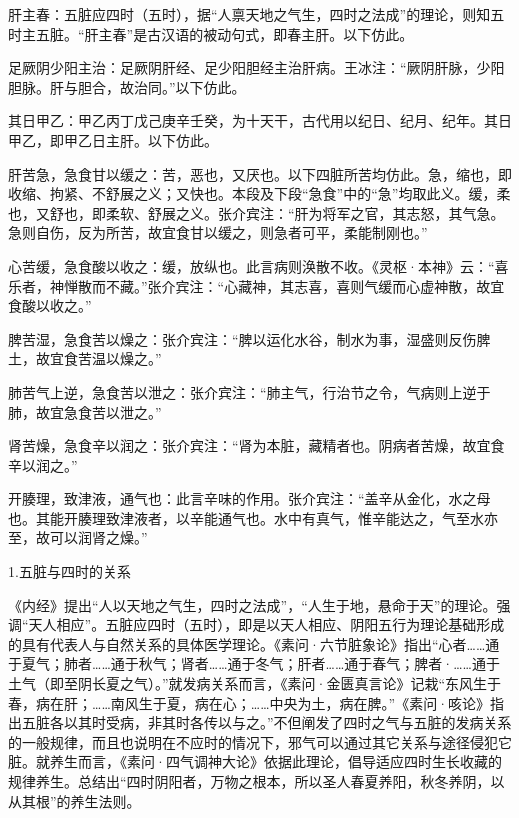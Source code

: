 \documentclass[draft,12pt]{ctexbook}
\begin{document}
\begin{jiaozhu}
	\item 肝主春：五脏应四时（五时），据“人禀天地之气生，四时之法成”的理论，则知五时主五脏。“肝主春”是古汉语的被动句式，即春主肝。以下仿此。
	\item 足厥阴少阳主治：足厥阴肝经、足少阳胆经主治肝病。王冰注：“厥阴肝脉，少阳胆脉。肝与胆合，故治同。”以下仿此。
	\item 其日甲乙：甲乙丙丁戊己庚辛壬癸，为十天干，古代用以纪日、纪月、纪年。其日甲乙，即甲乙日主肝。以下仿此。
	\item 肝苦急，急食甘以缓之：苦，恶也，又厌也。以下四脏所苦均仿此。急，缩也，即收缩、拘紧、不舒展之义；又快也。本段及下段“急食”中的“急”均取此义。缓，柔也，又舒也，即柔软、舒展之义。张介宾注：“肝为将军之官，其志怒，其气急。急则自伤，反为所苦，故宜食甘以缓之，则急者可平，柔能制刚也。”
	\item 心苦缓，急食酸以收之：缓，放纵也。此言病则涣散不收。《灵枢·本神》云：“喜乐者，神惮散而不藏。”张介宾注：“心藏神，其志喜，喜则气缓而心虚神散，故宜食酸以收之。”
	\item 脾苦湿，急食苦以燥之：张介宾注：“脾以运化水谷，制水为事，湿盛则反伤脾土，故宜食苦温以燥之。”
	\item 肺苦气上逆，急食苦以泄之：张介宾注：“肺主气，行治节之令，气病则上逆于肺，故宜急食苦以泄之。”
	\item 肾苦燥，急食辛以润之：张介宾注：“肾为本脏，藏精者也。阴病者苦燥，故宜食辛以润之。”
	\item 开腠理，致津液，通气也：此言辛味的作用。张介宾注：“盖辛从金化，水之母也。其能开腠理致津液者，以辛能通气也。水中有真气，惟辛能达之，气至水亦至，故可以润肾之燥。”
\end{jiaozhu}


1.五脏与四时的关系

《内经》提出“人以天地之气生，四时之法成”，“人生于地，悬命于天”的理论。强调“天人相应”。五脏应四时（五时），即是以天人相应、阴阳五行为理论基础形成的具有代表人与自然关系的具体医学理论。《素问·六节脏象论》指出“心者……通于夏气；肺者……通于秋气；肾者……通于冬气；肝者……通于春气；脾者·……通于土气（即至阴长夏之气）。”就发病关系而言，《素问·金匮真言论》记栽“东风生于春，病在肝；……南风生于夏，病在心；……中央为土，病在脾。”《素问·咳论》指出五脏各以其时受病，非其时各传以与之。”不但阐发了四时之气与五脏的发病关系的一般规律，而且也说明在不应时的情况下，邪气可以通过其它关系与途径侵犯它脏。就养生而言，《素问·四气调神大论》依据此理论，倡导适应四时生长收藏的规律养生。总结出“四时阴阳者，万物之根本，所以圣人春夏养阳，秋冬养阴，以从其根”的养生法则。
\end{document}
